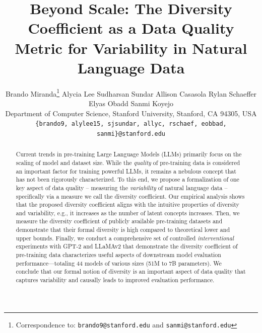 \documentclass[twoside,11pt]{article}
\begin{document}
\title{Beyond Scale: The Diversity Coefficient as a Data Quality Metric for Variability in Natural Language Data}

\author{%
  \name Brando Miranda\thanks{Correspondence to: \texttt{brando9@stanford.edu} and \texttt{sanmi@stanford.edu}}
  \AND
  \name Alycia Lee \AND
  \name Sudharsan Sundar \AND
  \name Allison Casasola \AND
  \name Rylan Schaeffer \AND
  \name Elyas Obadd \AND
  \name Sanmi Koyejo \\
  \addr Department of Computer Science, Stanford University, Stanford, CA 94305, USA \\
  \texttt{\{brando9, alylee15, sjsundar, allyc, rschaef, eobbad, sanmi\}@stanford.edu}
}


\maketitle

\begin{abstract}
Current trends in pre-training Large Language Models (LLMs) primarily focus on the scaling of model and dataset size.
While the \textit{quality} of pre-training data is considered an important factor for training powerful LLMs, it remains a nebulous concept that has not been rigorously characterized.
To this end, we propose a formalization of one key aspect of data quality -- measuring the \textit{variability} of natural language data -- specifically via a measure we call the diversity coefficient.
Our empirical analysis shows that the proposed diversity coefficient aligns with the intuitive properties of diversity and variability,
e.g., it increases as the number of latent concepts increases.
Then, we measure the diversity coefficient of publicly available pre-training datasets and demonstrate that their formal diversity is high compared to theoretical lower and upper bounds.
Finally, we conduct a comprehensive set of controlled \textit{interventional} experiments with GPT-2 and LLaMAv2 that demonstrate the diversity coefficient of pre-training data characterizes useful aspects of downstream model evaluation performance---totaling 44 models of various sizes (51M to 7B parameters).
We conclude that our formal notion of diversity is an important aspect of data quality that captures variability and causally leads to improved evaluation performance.
\end{abstract}
\end{document}
